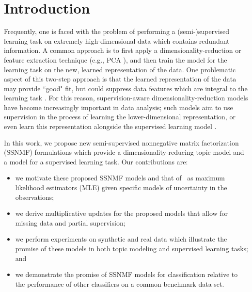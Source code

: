 \documentclass[twocolumn,10pt]{article}
\begin{document}
\section{Introduction}
Frequently, one is faced with the problem of performing a (semi-)supervised learning task on extremely high-dimensional data which contains redundant information.  A common approach is to first apply a dimensionality-reduction or feature extraction technique (e.g., PCA \cite{pearson1901liii}), and then train the model for the learning task on the new, learned 
representation of the data.  One problematic aspect of this two-step approach is that the learned representation of the data may provide ``good" fit, but could suppress data features which are integral to the learning task \cite{guyon2003introduction}.
For this reason, supervision-aware dimensionality-reduction models have become increasingly important in data analysis; such models aim to use supervision in the process of learning the lower-dimensional representation, or even learn this representation alongside the supervised learning model \cite{wang2014role,blei2003latent,pritchard2000inference}. 

In this work, we propose new semi-supervised nonnegative matrix factorization (SSNMF) formulations which provide a dimensionality-reducing topic model and a model for a supervised learning task.   
Our contributions are:
\begin{itemize}
    \item we motivate these proposed SSNMF models and that of~\cite{lee2009semi} as maximum likelihood estimators (MLE) given specific models of uncertainty in the observations;
    \item we derive multiplicative updates for the proposed models that allow for missing data and partial supervision;
    \item we perform experiments on synthetic and real data which illustrate the promise of these models in both topic modeling and supervised learning tasks; and
    \item we demonstrate the promise of SSNMF models for classification relative to the performance of other classifiers on a common benchmark data set.
\end{itemize}
\end{document}
